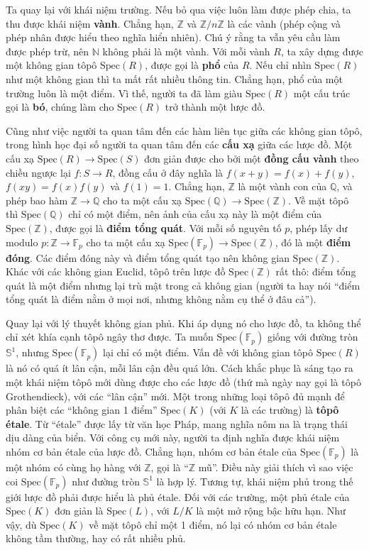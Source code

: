 \documentclass[12pt]{article}
\begin{document}
Ta quay lại với khái niệm trường. Nếu bỏ qua việc luôn làm được phép chia, ta thu được khái niệm {\bf vành}. Chẳng hạn, $\mathbb{Z}$ và $\mathbb{Z}/n\mathbb{Z}$ là các vành (phép cộng và phép nhân được hiểu theo nghĩa hiển nhiên). Chú ý rằng ta vẫn yêu cầu làm được phép trừ, nên $\mathbb{N}$ không phải là một vành. Với mỗi vành $R$, ta xây dựng được một không gian tôpô $\text{Spec}(R)$, được gọi là {\bf phổ} của $R$. Nếu chỉ nhìn $\text{Spec}(R)$ như một không gian thì ta mất rất nhiều thông tin. Chẳng hạn, phổ của một trường luôn là một điểm. Vì thế, người ta đã làm giàu $\text{Spec}(R)$ một cấu trúc gọi là {\bf bó}, chúng làm cho $\text{Spec}(R)$ trở thành một lược đồ.

Cũng như việc người ta quan tâm đến các hàm liên tục giữa các không gian tôpô, trong hình học đại số người ta quan tâm đến các {\bf cấu xạ} giữa các lược đồ. Một cấu xạ $\text{Spec}(R) \to \text{Spec}(S)$ đơn giản được cho bởi một {\bf đồng cấu vành} theo chiều ngược lại $f: S \to R$, đồng cấu ở đây nghĩa là $f(x+y) = f(x)+f(y)$, $f(xy) = f(x)f(y)$ và $f(1) = 1$. Chẳng hạn, $\mathbb{Z}$ là một vành con của $\mathbb{Q}$, và phép bao hàm $\mathbb{Z} \to \mathbb{Q}$ cho ta một cấu xạ $\text{Spec}(\mathbb{Q}) \to \text{Spec}(\mathbb{Z})$. Về mặt tôpô thì $\text{Spec}(\mathbb{Q})$ chỉ có một điểm, nên ảnh của cấu xạ này là một điểm của $\text{Spec}(\mathbb{Z})$, được gọi là {\bf điểm tổng quát}. Với mỗi số nguyên tố $p$, phép lấy dư modulo $p: \mathbb{Z} \to \mathbb{F}_p$ cho ta một cấu xạ $\text{Spec}(\mathbb{F}_p) \to \text{Spec}(\mathbb{Z})$, đó là một {\bf điểm đóng}. Các điểm đóng này và điểm tổng quát tạo nên không gian $\text{Spec}(\mathbb{Z})$. Khác với các không gian Euclid, tôpô trên lược đồ $\text{Spec}(\mathbb{Z})$ rất thô: điểm tổng quát là một điểm nhưng lại trù mật trong cả không gian (người ta hay nói ``điểm tổng quát là điểm nằm ở mọi nơi, nhưng không nằm cụ thể ở đâu cả'').

Quay lại với lý thuyết không gian phủ. Khi áp dụng nó cho lược đồ, ta không thể chỉ xét khía cạnh tôpô ngây thơ được. Ta muốn $\text{Spec}(\mathbb{F}_p)$ giống với đường tròn $\mathbb{S}^1$, nhưng $\text{Spec}(\mathbb{F}_p)$ lại chỉ có một điểm. Vấn đề với không gian tôpô $\text{Spec}(R)$ là nó có quá ít lân cận, mỗi lân cận đều quá lớn. Cách khắc phục là sáng tạo ra một khái niệm tôpô mới dùng được cho các lược đồ (thứ mà ngày nay gọi là tôpô Grothendieck), với các ``lân cận'' mới. Một trong những loại tôpô đủ mạnh để phân biệt các ``không gian 1 điểm'' $\text{Spec}(K)$ (với $K$ là các trường) là {\bf tôpô étale}. Từ ``étale'' được lấy từ văn học Pháp, mang nghĩa nôm na là trạng thái dịu dàng của biển. Với công cụ mới này, người ta định nghĩa được khái niệm nhóm cơ bản étale của lược đồ. Chẳng hạn, nhóm cơ bản étale của $\text{Spec}(\mathbb{F}_p)$ là một nhóm có cùng họ hàng với $\mathbb{Z}$, gọi là ``$\mathbb{Z}$ mũ''. Điều này giải thích vì sao việc coi $\text{Spec}(\mathbb{F}_p)$ như đường tròn $\mathbb{S}^1$ là hợp lý. Tương tự, khái niệm phủ trong thế giới lược đồ phải được hiểu là phủ étale. Đối với các trường, một phủ étale của $\text{Spec}(K)$ đơn giản là $\text{Spec}(L)$, với $L/K$ là một mở rộng bậc hữu hạn. Như vậy, dù $\text{Spec}(K)$ về mặt tôpô chỉ một 1 điểm, nó lại có nhóm cơ bản étale không tầm thường, hay có rất nhiều phủ. 
\end{document}
